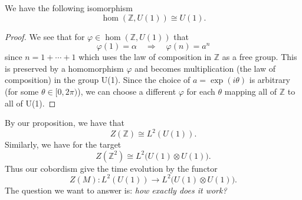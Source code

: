 \documentclass{amsart}
\numberwithin{equation}{section}
\begin{document}
\begin{prop}%
We have the following isomorphism
\begin{equation}%
\hom(\mathbb{Z},U(1))\cong U(1).
\end{equation}
\end{prop}
\begin{proof}
We see that for $\varphi\in\hom(\mathbb{Z},U(1))$ that
\begin{equation}%
\varphi(1)=\alpha\quad\Rightarrow\quad \varphi(n)=a^{n}
\end{equation}
since $n=1+\cdots+1$ which uses the law of composition in
$\mathbb{Z}$ as a free group. This is preserved by a homomorphism
$\varphi$ and becomes multiplication (the law of composition) in
the group U(1). Since the choice of $a=\exp(i\theta)$ is
arbitrary (for some $\theta\in[0,2\pi)$), we can choose a
  different $\varphi$ for each $\theta$ mapping all of
  $\mathbb{Z}$ to all of U(1).
\end{proof}

By our proposition, we have that
\begin{equation}%
Z(\mathbb{Z})\cong L^{2}(U(1)).
\end{equation}
Similarly, we have for the target
\begin{equation}%
Z(\mathbb{Z}^{2})\cong L^{2}\Big(U(1)\otimes U(1)\Big).
\end{equation}
Thus our cobordism give the time evolution by the functor
\begin{equation}%
Z(M): L^{2}(U(1))\to L^{2}\Big(U(1)\otimes U(1)\Big).
\end{equation}
The question we want to answer is: \emph{how exactly does it
  work?}
\end{document}
